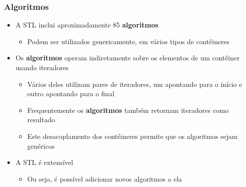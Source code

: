 \documentclass[xcolor={dvipsnames,table},aspectratio=169]{beamer}
\begin{document}
\begin{frame}\frametitle{Algoritmos}
\begin{itemize}
	\item A STL inclui aproximadamente 85 \textbf{algoritmos}
	\begin{itemize}
		\item Podem ser utilizados genericamente, em vários tipos de contêineres
	\end{itemize}
	\item Os \textbf{algoritmos} operam indiretamente sobre os elementos de um contêiner usando iteradores
	\begin{itemize}
		\item Vários deles utilizam pares de iteradores, um apontando para o início e outro apontando para o final
		\item Frequentemente os \textbf{algoritmos} também retornam iteradores como resultado
		\item Este desacoplamento dos contêineres permite que os algoritmos sejam genéricos
	\end{itemize}
	\item A STL é extensível
	\begin{itemize}
		\item Ou seja, é possível adicionar novos algoritmos a ela
	\end{itemize}
\end{itemize}
\end{frame}
\end{document}

